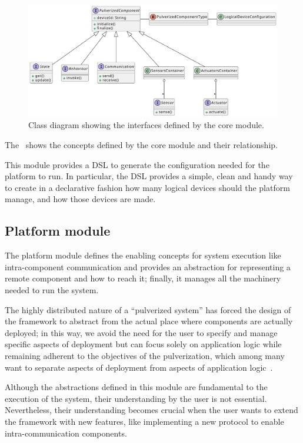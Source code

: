 \begin{figure}
	\centering
	\includegraphics[width=\textwidth]{figures/core-design-interfaces.pdf}
	\caption{Class diagram showing the interfaces defined by the core module.}
	\label{fig:core-module-architecture}
\end{figure}

The~ shows the concepts defined by the core module and their relationship.

This module provides a DSL to generate the configuration needed for the platform to run. In particular, the DSL provides a simple, clean and handy
way to create in a declarative fashion how many logical devices should the platform manage, and how those devices are made.

\subsection{Platform module}
\label{sec:platform-module}

The platform module defines the enabling concepts for system execution like intra-component communication and provides an abstraction for
representing a remote component and how to reach it; finally, it manages all the machinery needed to run the system.

The highly distributed nature of a ``pulverized system'' has forced the design of the framework to abstract from the actual place where components
are actually deployed; in this way, we avoid the need for the user to specify and manage specific aspects of deployment but can focus solely on
application logic while remaining adherent to the objectives of the pulverization, which among many want to separate aspects of
deployment from aspects of application logic~\cite{fi12110203}.

Although the abstractions defined in this module are fundamental to the execution of the system, their understanding by the user is not essential.
Nevertheless, their understanding becomes crucial when the user wants to extend the framework with new features, like implementing a new protocol to
enable intra-communication components.

